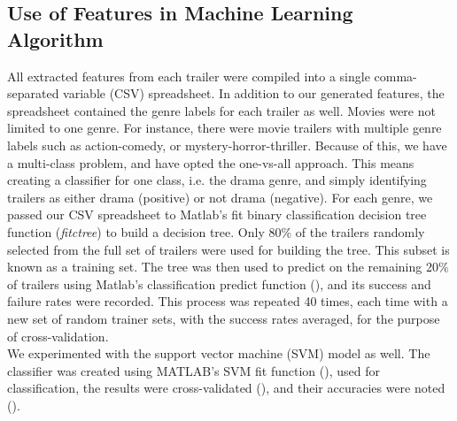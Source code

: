 \documentclass[letterpaper, 10 pt, conference]{ieeeconf}  %
\begin{document}
\subsection{Use of Features in Machine Learning Algorithm}
All extracted features from each trailer were compiled into a single comma-separated variable (CSV) spreadsheet. In addition to our generated features, the spreadsheet contained the genre labels for each trailer as well. Movies were not limited to one genre. For instance, there were movie trailers with multiple genre labels such as action-comedy, or mystery-horror-thriller. Because of this, we have a multi-class problem, and have opted the one-vs-all approach.  This means creating a classifier for one class, i.e. the drama genre, and simply identifying trailers as either drama (positive) or not drama (negative). 
\indent For each genre, we passed our CSV spreadsheet to Matlab's fit binary classification decision tree function (\textit{fitctree}) to build a decision tree. Only 80\% of the trailers randomly selected from the full set of trailers were used for building the tree. This subset is known as a training set. The tree was then used to predict on the remaining 20\%  of trailers using Matlab's classification predict function (), and its success and failure rates were recorded. This process was repeated 40 times, each time with a new set of random trainer sets, with the success rates averaged, for the purpose of cross-validation.\\
\indent We experimented with the support vector machine (SVM) model as well. The classifier was created using MATLAB's SVM fit function (), used for classification, the results were cross-validated (), and their accuracies were noted (). 


\end{document}

